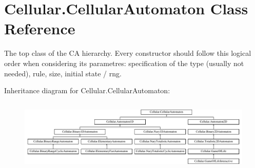 \hypertarget{class_cellular_1_1_cellular_automaton}{}\section{Cellular.\+Cellular\+Automaton Class Reference}
\label{class_cellular_1_1_cellular_automaton}


The top class of the C\+A hierarchy. Every constructor should follow this logical order when considering its parametres\+: specification of the type (usually not needed), rule, size, initial state / rng.  


Inheritance diagram for Cellular.\+Cellular\+Automaton\+:\begin{figure}[H]
\begin{center}
\leavevmode
\includegraphics[height=3.500000cm]{class_cellular_1_1_cellular_automaton}
\end{center}
\end{figure}
